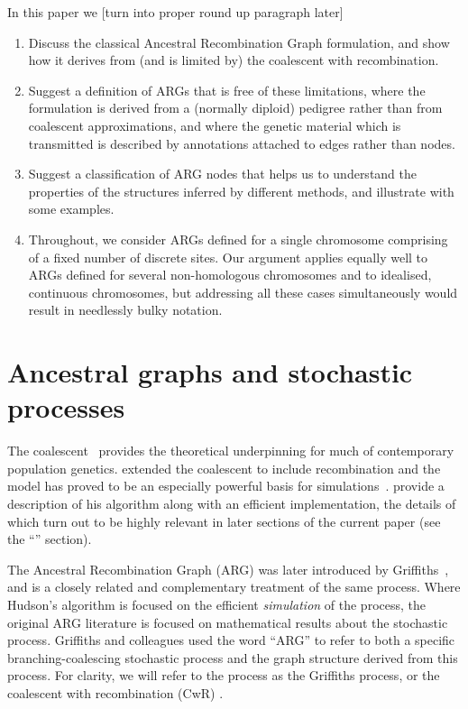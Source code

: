 \documentclass{article}
\begin{document}
In this paper we [turn into proper round up paragraph later]
\begin{enumerate}
\item Discuss the classical Ancestral Recombination Graph formulation,
and show how it derives from (and is limited by) the coalescent with
recombination.
\item Suggest a definition of ARGs that is free of these limitations,
where the formulation is derived from a (normally diploid) pedigree rather than from
coalescent approximations, and where the genetic
material which is transmitted is described by annotations attached to
edges rather than nodes.
\item Suggest a classification of ARG nodes that helps us to understand
the properties of the structures inferred by different methods, and illustrate
with some examples.
\item Throughout, we consider ARGs defined for a single chromosome comprising
of a fixed number of discrete sites. Our argument applies equally well to ARGs
defined for several non-homologous chromosomes \citep{fearnhead2003ancestral,
koskela2019robust} and to idealised, continuous chromosomes, but addressing
all these cases simultaneously would result in needlessly bulky notation.
\end{enumerate}

\section*{Ancestral graphs and stochastic processes}
The coalescent~\citep{kingman1982coalescent,kingman1982genealogy,
hudson1983testing, tajima1983evolutionary}
provides the theoretical underpinning for much of contemporary population genetics.
\citet{hudson1983properties,hudson1990gene} extended the coalescent to include
recombination
and the model has proved to be an especially powerful basis for
simulations~\citep{hudson2002generating,baumdicker2021efficient}.
\cite{kelleher2016efficient} provide a description of his algorithm along with
an efficient implementation, the details of which turn out to be highly relevant in 
later sections of the current paper (see the ``'' section).

The Ancestral Recombination Graph (ARG) was later introduced by
Griffiths~\citep{griffiths1991two,ethier1990two,griffiths1996ancestral,
griffiths1997ancestral}, and is a
closely related and complementary treatment of the same process. Where
Hudson's algorithm is focused on the efficient \emph{simulation} of the
process, the original ARG literature is focused on mathematical
results about the stochastic process. Griffiths and colleagues used the word
``ARG'' to refer to both a specific branching-coalescing stochastic process and
the graph structure derived from this process. For clarity, we will refer to the
process as the Griffiths process, or the coalescent with recombination (CwR)
\citep{minichiello2006mapping}.
\end{document}
